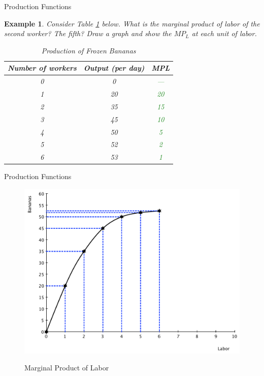 \documentclass[xcolor={dvipsnames},pdf, hyperref={colorlinks=true, citecolor=ForestGreen, linkcolor=BlueViolet, urlcolor=Magenta}]{beamer}
\newtheorem{exmp}{Example}[section]
\newcommand{\ddp}[1]{{\textcolor{ForestGreen}{#1}}}
\begin{document}
\begin{frame}{Production Functions}
	\begin{exmp}
		
		Consider Table \ref{bluth} below. What is the marginal product of labor of the second worker? The fifth? Draw a graph and show the $MP_L$ at each unit of labor.
		
		\begin{table}[ht]
			\centering
			\caption{Production of Frozen Bananas}
			\label{bluth}
			\begin{tabular}{ c|c|c}        
				
				Number of workers & Output (per day) & MPL \\
				\hline
				0 & 0 & \ddp{---} \\
				1 & 20 & \ddp{20} \\
				2 & 35 & \ddp{15} \\
				3 & 45 & \ddp{10} \\
				4 & 50 & \ddp{5} \\
				5 & 52 & \ddp{2} \\
				6 & 53 & \ddp{1} \\
			\end{tabular}
		\end{table} 
	\end{exmp}
\end{frame}

\begin{frame}[b]{Production Functions}
	\begin{figure}[H]
		\centering
		\ddp{\includegraphics[scale=.40]{plot55.pdf}}
		\caption{Marginal Product of Labor}
	\end{figure}
\end{frame}
\end{document}
